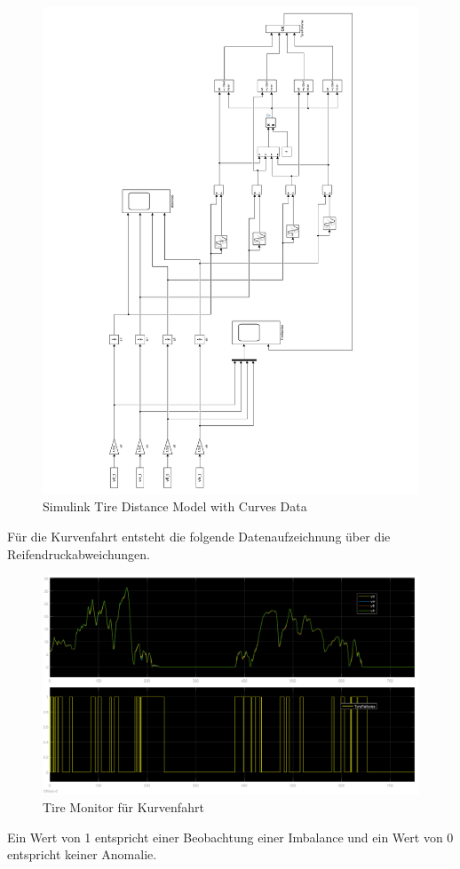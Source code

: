 \begin{figure}[H]
	\centering
	\includegraphics[height=0.95\textheight]{../Graphiken/TireSimCurvesLandscape.pdf}
	\caption{Simulink Tire Distance Model with Curves Data}
	\label{fig:TireSImCurves}
\end{figure}


Für die Kurvenfahrt entsteht die folgende Datenaufzeichnung über die Reifendruckabweichungen.
\begin{figure}[H]
	\centering
	\includegraphics[width=0.95\linewidth]{../Graphiken/CurvesTireMonitor.png}
	\caption{Tire Monitor für Kurvenfahrt}
\end{figure}
Ein Wert von 1  entspricht einer Beobachtung einer Imbalance und ein Wert von 0 entspricht keiner Anomalie.








	
	

	
	
	
	